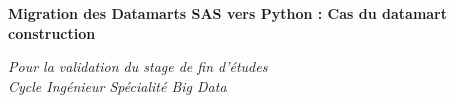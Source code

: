 \documentclass[11pt,a4paper]{report}
\begin{document}
\begin{titlepage}
\begin{minipage}[t]{\dimexpr\paperwidth - 3.6cm\relax}
    \vspace{0.6cm}

    \noindent{\color{midBlue}\rule{\linewidth}{1.2pt}}

    \vspace{0.8cm}

    \begin{center}
        {\color{darkBlue}\fontsize{23}{30}\selectfont\bfseries\sffamily
         Migration des Datamarts SAS vers Python : Cas du  datamart construction}
    \end{center}

    \vspace{0.8cm}

    \noindent{\color{midBlue}\rule{\linewidth}{1.2pt}}

    \vspace{1.0cm}

    \begin{center}
        {\color{midBlue}\large\itshape
         Pour la validation du stage de fin d'études\\[0.2cm]
         Cycle Ingénieur \textemdash{} Spécialité Big Data}
    \end{center}

    \vspace{1.8cm}


\end{minipage}
\end{titlepage}
\end{document}

